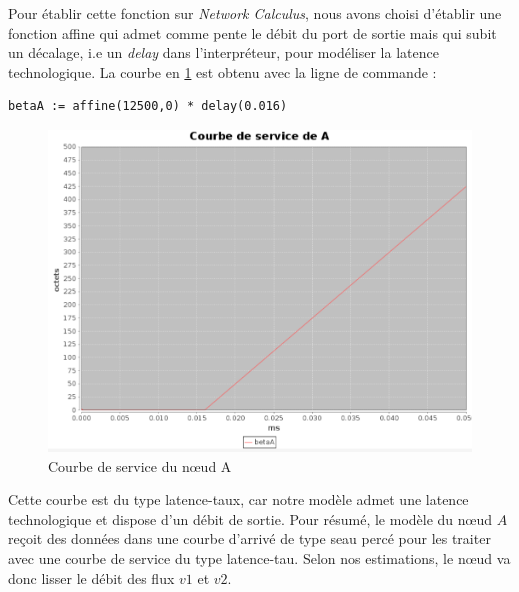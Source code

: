 Pour établir cette fonction sur \emph{Network Calculus}, nous avons choisi d'établir une fonction affine qui admet comme pente le débit du port de sortie mais qui subit un décalage, i.e un \emph{delay} dans l'interpréteur, pour modéliser la latence technologique. La courbe en \ref{fig:serviceA} est obtenu avec la ligne de commande :
\begin{verbatim}
betaA := affine(12500,0) * delay(0.016) 
\end{verbatim}
\begin{figure}[!ht]
\centering
\includegraphics[width = .5\textwidth]{./I/images/beta_A.png}
\caption{\label{fig:serviceA}Courbe de service du nœud A}
\end{figure} 

Cette courbe est du type latence-taux, car notre modèle admet une latence technologique et dispose d'un débit de sortie. Pour résumé, le modèle du nœud $A$ reçoit des données dans une courbe d'arrivé de type seau percé pour les traiter avec une courbe de service du type latence-tau. Selon nos estimations, le nœud va donc lisser le débit des flux $v1$ et $v2$.

